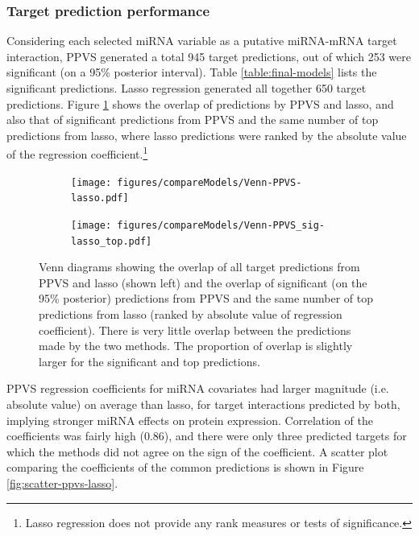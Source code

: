 \subsubsection*{Target prediction performance}

Considering each selected miRNA variable as a putative miRNA-mRNA target
interaction, PPVS generated a total 945 target predictions, out of which
253 were significant (on a 95\% posterior interval). Table \ref{table:final-models}
lists the significant predictions.
Lasso regression generated all together 650 target predictions. Figure
\ref{fig:venn} shows the overlap of predictions by PPVS and lasso, and also
that of significant predictions from PPVS and the same number of top
predictions from lasso, where lasso predictions were ranked by the absolute value of
the regression coefficient.\footnote{Lasso regression does not provide any
rank measures or tests of significance.}

\begin{figure}[!h]
  \centering
  \begin{subfigure}{.45\textwidth}
    \centering
    \texttt{[image: figures/compareModels/Venn-PPVS-lasso.pdf]}
  \end{subfigure}
  \begin{subfigure}{.45\textwidth}
    \centering
    \texttt{[image: figures/compareModels/Venn-PPVS\_sig-lasso\_top.pdf]}
  \end{subfigure}

  \caption{Venn diagrams showing the overlap of all target predictions from PPVS
  and lasso (shown left) and the overlap of significant (on the 95\% posterior) predictions
  from PPVS  and the same number of top predictions from lasso (ranked by
  absolute value of regression coefficient). There is very little overlap
  between the predictions made by the two methods. The proportion of overlap is
  slightly larger for the significant and top predictions.}
  \label{fig:venn}
\end{figure}

PPVS regression coefficients for miRNA covariates had larger magnitude (i.e. absolute value)
on average than lasso, for target interactions predicted by both, 
implying stronger miRNA effects on protein expression.
Correlation of the coefficients was
fairly high ($0.86$), and there were only three predicted targets for which
the methods did not agree on the sign of the coefficient. A scatter plot
comparing the coefficients of the common predictions is shown in Figure
\ref{fig:scatter-ppvs-lasso}.

